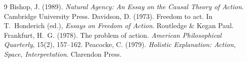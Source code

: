\documentclass{situationist-preprint}
\begin{document}
\begin{thebibliography}{9}
 Bishop, J. (1989). \emph{Natural Agency: An Essay on the Causal Theory of Action}. Cambridge University Press.
 Davidson, D. (1973). Freedom to act. In T.~Honderich (ed.), \emph{Essays on Freedom of Action}. Routledge \& Kegan Paul.
 Frankfurt, H.~G. (1978). The problem of action. \emph{American Philosophical Quarterly}, 15(2), 157--162.
 Peacocke, C. (1979). \emph{Holistic Explanation: Action, Space, Interpretation}. Clarendon Press.
\end{thebibliography}
\end{document}
